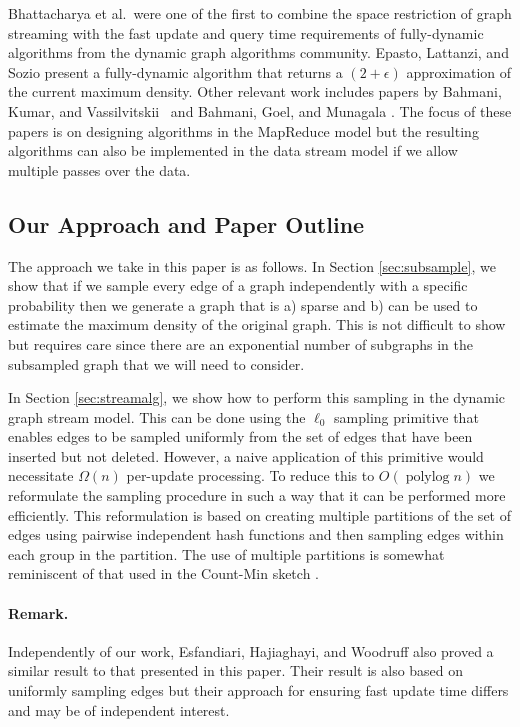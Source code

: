 \documentclass[11pt]{article}
\DeclareMathOperator{\polylog}{polylog}
\begin{document}
Bhattacharya et al.~were one of the first to combine the space restriction of graph streaming with the fast update and query time requirements of fully-dynamic algorithms from the dynamic graph algorithms community. 
Epasto, Lattanzi, and Sozio \cite{EpastoLS15} present a fully-dynamic algorithm that returns a $(2+\epsilon)$ approximation of the current maximum density.
Other relevant work includes papers by Bahmani, Kumar, and Vassilvitskii~\cite{BahmaniKV12} and Bahmani, Goel, and  Munagala \cite{BahmaniGM14}. The focus of these papers is on designing algorithms in the MapReduce model but the resulting algorithms can also be implemented in the data stream model if we allow multiple passes over the data.




\subsection{Our Approach and Paper Outline}

The approach we take in this paper is as follows. In Section \ref{sec:subsample}, we show that if we sample every edge of a graph independently with a specific probability then we generate a graph that is a) sparse and b) can be used to estimate the maximum density of the original graph. This is not difficult to show but requires care since there are an exponential number of subgraphs in the subsampled graph that we will need to consider.

In Section \ref{sec:streamalg}, we show how to perform this sampling in the dynamic graph stream model. This can be done using the $\ell_0$ sampling primitive \cite{JowhariST11,CormodeF14} that enables edges to be sampled uniformly from the set of edges that have been inserted but not deleted. However, a naive application of this primitive would necessitate $\Omega(n)$ per-update processing. To reduce this to $O(\polylog n)$ we reformulate the sampling procedure in such a way that it can be performed more efficiently. This reformulation is based on creating multiple partitions of the set of edges using pairwise independent hash functions and then sampling edges within each group in the partition. The use of multiple partitions is somewhat reminiscent of that used in the Count-Min sketch \cite{CormodeM05}.

\paragraph{Remark.} Independently of our work,  Esfandiari, Hajiaghayi, and Woodruff \cite{EsfandiariHW15}  also proved a similar result to that presented in this paper. Their result is also based on uniformly sampling edges but their approach for ensuring fast update time differs and may be of independent interest.
\end{document}
